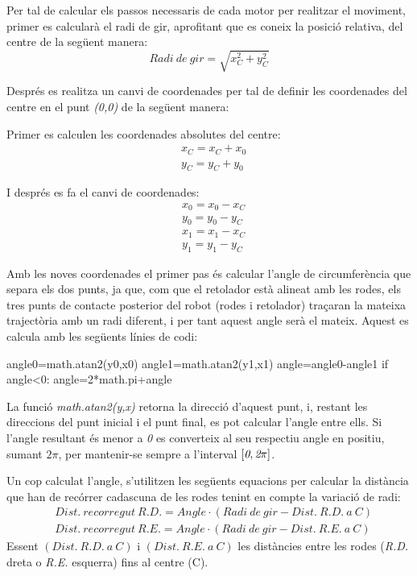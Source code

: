 Per tal de calcular els passos necessaris de cada motor per realitzar el moviment, primer es calcularà el radi de gir, aprofitant que es coneix la posició relativa, del centre de la següent manera:
\begin{equation}
Radi \ de \ gir = \sqrt{x_{C}^2+y_{C}^2}
\end{equation}


Després es realitza un canvi de coordenades per tal de definir les coordenades del centre en el punt \emph{(0,0)} de la següent manera:

Primer es calculen les coordenades absolutes del centre:
\begin{eqnarray}
\nonumber & x_{C}=x_{C}+x_{0} \\
& y_{C}=y_{C}+y_{0}
\end{eqnarray}

I després es fa el canvi de coordenades:
\begin{eqnarray}
\nonumber & x_{0}=x_{0}-x_{C} \\
\nonumber & y_{0}=y_{0}-y_{C} \\
\nonumber & x_{1}=x_{1}-x_{C} \\
& y_{1}=y_{1}-y_{C}
\end{eqnarray}

Amb les noves coordenades el primer pas és calcular l’angle de circumferència que separa els dos punts, ja que, com que el retolador està alineat amb les rodes, els tres punts de contacte posterior del robot (rodes i retolador) traçaran la mateixa trajectòria amb un radi diferent, i per tant aquest angle serà el mateix. Aquest es calcula amb les següents línies de codi:

\begin{python}
	angle0=math.atan2(y0,x0)
	angle1=math.atan2(y1,x1)
	angle=angle0-angle1
	if angle<0:
	angle=2*math.pi+angle
\end{python}

La funció \emph{math.atan2(y,x)} retorna la direcció d’aquest punt, i, restant les direccions del punt inicial i el punt final, es pot calcular l'angle entre ells. Si l’angle resultant és menor a \emph{0} es converteix al seu respectiu angle en positiu, sumant $2\pi$, per mantenir-se sempre a l’interval $[\emph{0},\emph{2} \pi]$.

Un cop calculat l’angle, s’utilitzen les següents equacions per calcular la distància que han de recórrer cadascuna de les rodes tenint en compte la variació de radi:
\begin{eqnarray}
\nonumber &Dist. \ recorregut \ R.D. = Angle \cdot (Radi \ de \ gir-Dist. \ R.D. \ a \ C) \\ 
&Dist. \ recorregut \ R.E. = Angle \cdot (Radi \ de \ gir-Dist. \ R.E. \ a \ C)
\end{eqnarray}
Essent  $(Dist. \ R.D. \ a \ C)$ i $(Dist. \ R.E. \ a \ C)$ les distàncies entre les rodes (\emph{R.D.} dreta o \emph{R.E.} esquerra) fins al centre (C).

